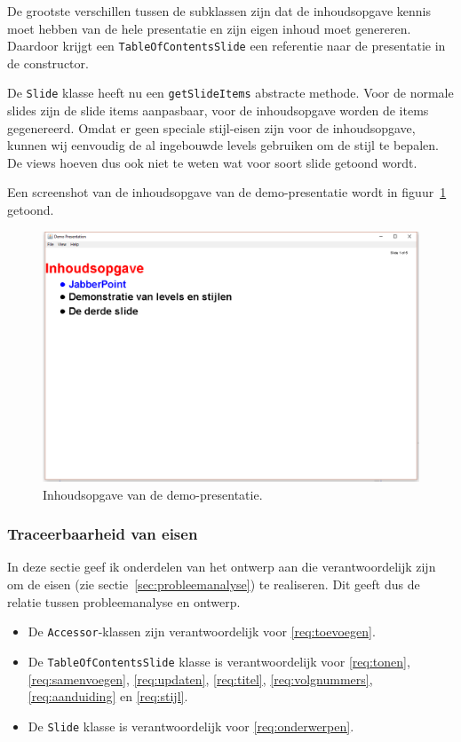 \documentclass[a4paper]{article}
\newcommand{\reqref}[1]{\ref{req:#1}}
\newcommand{\code}[1]{\lstinline[columns=fixed]{#1}}
\begin{document}
			De grootste verschillen tussen de subklassen zijn dat de inhoudsopgave kennis moet hebben van de hele presentatie en zijn eigen inhoud moet genereren.
			Daardoor krijgt een \code{TableOfContentsSlide} een referentie naar de presentatie in de constructor.

			De \code{Slide} klasse heeft nu een \code{getSlideItems} abstracte methode.
			Voor de normale slides zijn de slide items aanpasbaar, voor de inhoudsopgave worden de items gegenereerd.
			Omdat er geen speciale stijl-eisen zijn voor de inhoudsopgave, kunnen wij eenvoudig de al ingebouwde levels gebruiken om de stijl te bepalen.
			De views hoeven dus ook niet te weten wat voor soort slide getoond wordt.

			Een screenshot van de inhoudsopgave van de demo-presentatie wordt in figuur~\ref{fig:master} getoond.
			\begin{figure}[!htb]
			 \caption{
				Inhoudsopgave van de demo-presentatie.\label{fig:master}
			 }
			 \centering \includegraphics[width=\textwidth]{Screenshots/master.png}
			\end{figure}

		\subsubsection{Traceerbaarheid van eisen}
			In deze sectie geef ik onderdelen van het ontwerp aan die verantwoordelijk zijn om de eisen (zie sectie~\ref{sec:probleemanalyse}) te realiseren.
			Dit geeft dus de relatie tussen probleemanalyse en ontwerp.

			\begin{itemize}
				\item De \code{Accessor}-klassen zijn verantwoordelijk voor \reqref{toevoegen}.
				\item De \code{TableOfContentsSlide} klasse is verantwoordelijk voor \reqref{tonen}, \reqref{samenvoegen},
					\reqref{updaten}, \reqref{titel}, \reqref{volgnummers}, \reqref{aanduiding} en \reqref{stijl}.
				\item De \code{Slide} klasse is verantwoordelijk voor \reqref{onderwerpen}.
			\end{itemize}
\end{document}
